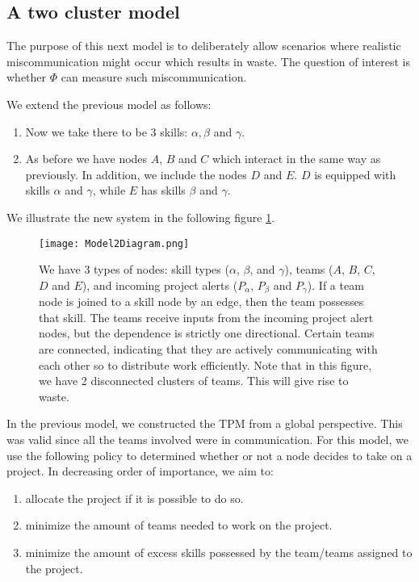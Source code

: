 \subsection{A two cluster model}

The purpose of this next model is to deliberately allow scenarios where realistic miscommunication might occur which results in waste. The question of interest is whether $\Phi$ can measure such miscommunication.

We extend the previous model as follows: 
\begin{enumerate}
	\item Now we take there to be 3 skills: $\alpha, \beta$ and $\gamma$.
	
	\item As before we have nodes $A$, $B$ and $C$ which interact in the same way as previously. In addition, we include the nodes $D$ and $E$. $D$ is equipped with skills $\alpha$ and $\gamma$, while $E$ has skills $\beta$ and $\gamma$. 
\end{enumerate}

We illustrate the new system in the following figure \ref{fig:diagram2}.
\begin{figure}[ht]
	\centering	
	\texttt{[image: Model2Diagram.png]}
	\caption{We have 3 types of nodes: skill types ($\alpha$, $\beta$, and $\gamma$), teams ($A$, $B$, $C$, $D$ and $E$), and incoming project alerts ($P_\alpha$, $P_\beta$ and $P_\gamma$). If a team node is joined to a skill node by an edge, then the team possesses that skill. The teams receive inputs from the incoming project alert nodes, but the dependence is strictly one directional.
	Certain teams are connected, indicating that they are actively communicating with each other so to distribute work efficiently. Note that in this figure, we have 2 disconnected clusters of teams. This will give rise to waste.}
	\label{fig:diagram2}
\end{figure}

In the previous model, we constructed the TPM from a global perspective. This was valid since all the teams involved were in communication. For this model, we use the following policy to determined whether or not a node decides  to take on a project. In decreasing order of importance, we aim to:


\begin{enumerate}
	\item allocate the project if it is possible to do so.
	\item minimize the amount of teams needed to work on the project.
	\item minimize the amount of excess skills possessed by the team/teams assigned to the project.
\end{enumerate}

